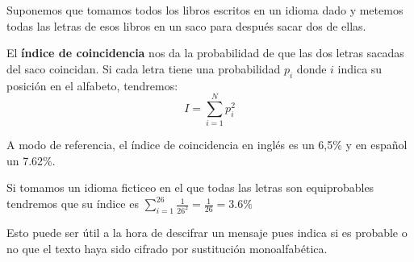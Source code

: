\begin{defn}
Suponemos que tomamos todos los libros escritos en un idioma dado y metemos todas las letras de esos libros en un saco para después sacar dos de ellas.

El \textbf{índice de coincidencia} nos da la probabilidad de que las dos letras sacadas del saco coincidan. Si cada letra tiene una probabilidad $p_i$ donde $i$ indica su posición en el alfabeto, tendremos:
\[I = \sum_{i=1}^N p_i^2\]

A modo de referencia, el índice de coincidencia en inglés es un 6,5\% y en español un 7.62\%.

Si tomamos un idioma ficticeo en el que todas las letras son equiprobables tendremos que su índice es $\sum_{i=1}^{26}\frac{1}{26^2} = \frac{1}{26} = 3.6\%$
\end{defn}

Esto puede ser útil a la hora de descifrar un mensaje pues indica si es probable o no que el texto haya sido cifrado por sustitución monoalfabética.

